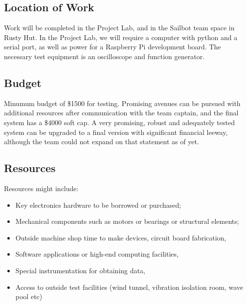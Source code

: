 \subsection{\label{sec:resources:location-of-work}Location of Work}
Work will be completed in the Project Lab, and in the Sailbot team space in Rusty Hut. In the Project Lab, we will require a computer with python and a serial port, as well as power for a Raspberry Pi development board. The necessary test equipment is an oscilloscope and function generator.

\subsection{\label{sec:resources:budget}Budget}
Minumum budget of \$1500 for testing. Promising avenues can be pursued with additional resources after communication with the team captain, and the final system has a \$4000 soft cap. A very promising, robust and adequately tested system can be upgraded to a final version with significant financial leeway, although the team could not expand on that statement as of yet. 

\subsection{\label{sec:resources:resources}Resources}
Resources might include:
\begin{itemize}
\item Key electronics hardware to be borrowed or purchased;
\item Mechanical components such as motors or bearings or structural elements;
\item Outside machine shop time to make devices, circuit board fabrication,
\item Software applications or high-end computing facilities,
\item Special instrumentation for obtaining data,
\item Access to outside test facilities (wind tunnel, vibration isolation room, wave pool etc)
\end{itemize}
